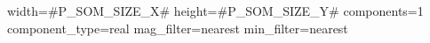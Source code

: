 width=#P_SOM_SIZE_X#
height=#P_SOM_SIZE_Y#
components=1
component_type=real
mag_filter=nearest
min_filter=nearest
